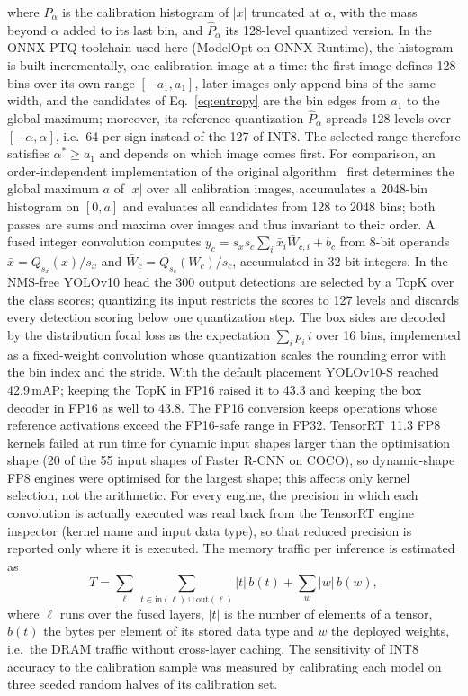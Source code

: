 \documentclass[pdflatex,sn-mathphys-num]{sn-jnl}%
\theoremstyle{thmstyleone}%
\theoremstyle{thmstyletwo}%
\theoremstyle{thmstylethree}%
\begin{document}
\begin{appendices}
where $P_\alpha$ is the calibration histogram of $|x|$ truncated at $\alpha$, with the mass beyond $\alpha$ added to its last bin, and $\hat P_\alpha$ its 128-level quantized version. In the ONNX PTQ toolchain used here (ModelOpt on ONNX Runtime), the histogram is built incrementally, one calibration image at a time: the first image defines 128 bins over its own range $[-a_1,a_1]$, later images only append bins of the same width, and the candidates of Eq.~\eqref{eq:entropy} are the bin edges from $a_1$ to the global maximum; moreover, its reference quantization $\hat P_\alpha$ spreads 128 levels over $[-\alpha,\alpha]$, i.e.\ 64 per sign instead of the 127 of INT8. The selected range therefore satisfies $\alpha^\ast\geq a_1$ and depends on which image comes first. For comparison, an order-independent implementation of the original algorithm~\cite{migacz2017tensorrt} first determines the global maximum $a$ of $|x|$ over all calibration images, accumulates a 2048-bin histogram on $[0,a]$ and evaluates all candidates from 128 to 2048 bins; both passes are sums and maxima over images and thus invariant to their order. A fused integer convolution computes $y_c=s_x s_c\sum_i\bar x_i\bar W_{c,i}+b_c$ from 8-bit operands $\bar x=Q_{s_x}(x)/s_x$ and $\bar W_c=Q_{s_c}(W_c)/s_c$, accumulated in 32-bit integers. In the NMS-free YOLOv10 head the 300 output detections are selected by a TopK over the class scores; quantizing its input restricts the scores to 127 levels and discards every detection scoring below one quantization step. The box sides are decoded by the distribution focal loss as the expectation $\sum_i p_i\,i$ over 16 bins, implemented as a fixed-weight convolution whose quantization scales the rounding error with the bin index and the stride. With the default placement YOLOv10-S reached 42.9\,mAP; keeping the TopK in FP16 raised it to 43.3 and keeping the box decoder in FP16 as well to 43.8. The FP16 conversion keeps operations whose reference activations exceed the FP16-safe range in FP32. TensorRT~11.3 FP8 kernels failed at run time for dynamic input shapes larger than the optimisation shape (20 of the 55 input shapes of Faster R-CNN on COCO), so dynamic-shape FP8 engines were optimised for the largest shape; this affects only kernel selection, not the arithmetic. For every engine, the precision in which each convolution is actually executed was read back from the TensorRT engine inspector (kernel name and input data type), so that reduced precision is reported only where it is executed. The memory traffic per inference is estimated as
\begin{equation}
T=\sum_{\ell}\ \sum_{t\in\mathrm{in}(\ell)\cup\mathrm{out}(\ell)}|t|\,b(t)+\sum_{w}|w|\,b(w),\label{eq:traffic}
\end{equation}
where $\ell$ runs over the fused layers, $|t|$ is the number of elements of a tensor, $b(t)$ the bytes per element of its stored data type and $w$ the deployed weights, i.e.\ the DRAM traffic without cross-layer caching. The sensitivity of INT8 accuracy to the calibration sample was measured by calibrating each model on three seeded random halves of its calibration set.


\end{appendices}
\end{document}
